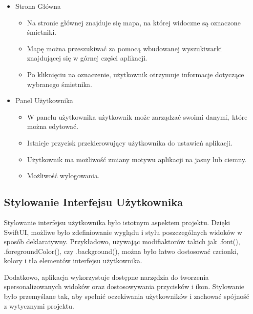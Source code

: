 \documentclass[12pt, a4paper, twoside, openany]{book}
\newcommand{\forceindent}{\leavevmode{\parindent=1.3em\indent}}
\begin{document}
\begin{itemize}
    \item Strona Główna
        \begin{itemize}
            \item Na stronie głównej znajduje się mapa, na której widoczne są oznaczone śmietniki.
            \item Mapę można przeszukiwać za pomocą wbudowanej wyszukiwarki znajdującej się w górnej części aplikacji.
            \item Po kliknięciu na oznaczenie, użytkownik otrzymuje informacje dotyczące wybranego śmietnika.
        \end{itemize}
\end{itemize}

\begin{itemize}
    \item Panel Użytkownika
        \begin{itemize}
            \item W panelu użytkownika użytkownik może zarządzać swoimi danymi, które można edytować.
            \item Istnieje przycisk przekierowujący użytkownika do ustawień aplikacji.
            \item Użytkownik ma możliwość zmiany motywu aplikacji na jasny lub ciemny.
            \item Możliwość wylogowania.
        \end{itemize}
\end{itemize}

\subsection{Stylowanie Interfejsu Użytkownika}
\forceindent Stylowanie interfejsu użytkownika było istotnym aspektem projektu. Dzięki SwiftUI, możliwe było zdefiniowanie wyglądu i stylu poszczególnych widoków w sposób deklaratywny. Przykładowo, używając modifiaktorów takich jak .font(), .foregroundColor(), czy .background(), można było łatwo dostosować czcionki, kolory i tła elementów interfejsu użytkownika.

Dodatkowo, aplikacja wykorzystuje dostępne narzędzia do tworzenia spersonalizowanych widoków oraz dostosowywania przycisków i ikon. Stylowanie było przemyślane tak, aby spełnić oczekiwania użytkowników i zachować spójność z wytycznymi projektu.
\end{document}
